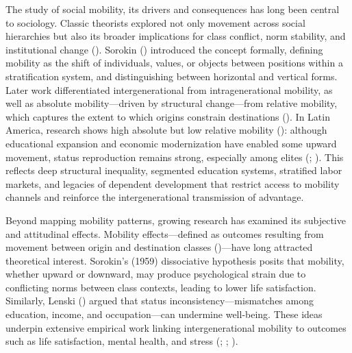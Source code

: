 \documentclass[
  13pt,
]{article}
\begin{document}
The study of social mobility, its drivers and consequences has long been
central to sociology. Classic theorists explored not only movement
across social hierarchies but also its broader implications for class
conflict, norm stability, and institutional change
(). Sorokin
() introduced the concept
formally, defining mobility as the shift of individuals, values, or
objects between positions within a stratification system, and
distinguishing between horizontal and vertical forms. Later work
differentiated intergenerational from intragenerational mobility, as
well as absolute mobility---driven by structural change---from relative
mobility, which captures the extent to which origins constrain
destinations (). In
Latin America, research shows high absolute but low relative mobility
(): although educational
expansion and economic modernization have enabled some upward movement,
status reproduction remains strong, especially among elites
(; ). This
reflects deep structural inequality, segmented education systems,
stratified labor markets, and legacies of dependent development that
restrict access to mobility channels and reinforce the intergenerational
transmission of advantage.

Beyond mapping mobility patterns, growing research has examined its
subjective and attitudinal effects. Mobility effects---defined as
outcomes resulting from movement between origin and destination classes
()---have long
attracted theoretical interest. Sorokin's (1959) dissociative hypothesis
posits that mobility, whether upward or downward, may produce
psychological strain due to conflicting norms between class contexts,
leading to lower life satisfaction. Similarly, Lenski
() argued that status
inconsistency---mismatches among education, income, and occupation---can
undermine well-being. These ideas underpin extensive empirical work
linking intergenerational mobility to outcomes such as life
satisfaction, mental health, and stress
(;
;
).
\end{document}

